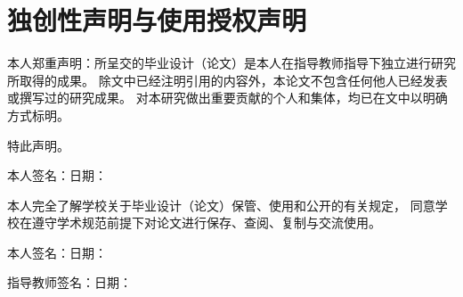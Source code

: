 \chapter*{独创性声明与使用授权声明}

本人郑重声明：所呈交的毕业设计（论文）是本人在指导教师指导下独立进行研究所取得的成果。
除文中已经注明引用的内容外，本论文不包含任何他人已经发表或撰写过的研究成果。
对本研究做出重要贡献的个人和集体，均已在文中以明确方式标明。

特此声明。

本人签名：\hspace{3cm}日期：\hspace{3cm}

\vspace{1.0cm}

本人完全了解学校关于毕业设计（论文）保管、使用和公开的有关规定，
同意学校在遵守学术规范前提下对论文进行保存、查阅、复制与交流使用。

本人签名：\hspace{3cm}日期：\hspace{3cm}

指导教师签名：\hspace{2.2cm}日期：\hspace{3cm}

